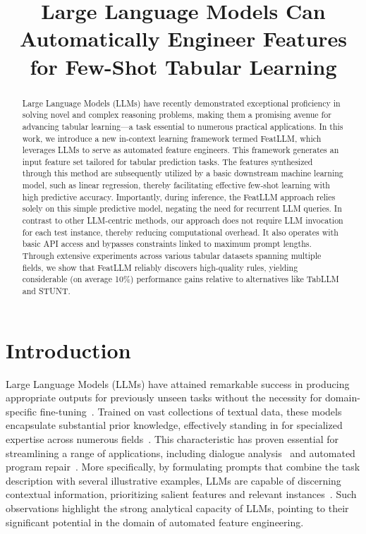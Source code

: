 \title{Large Language Models Can Automatically Engineer Features for Few-Shot Tabular Learning}

\begin{abstract}
Large Language Models (LLMs) have recently demonstrated exceptional proficiency in solving novel and complex reasoning problems, making them a promising avenue for advancing tabular learning—a task essential to numerous practical applications. In this work, we introduce a new in-context learning framework termed \textsf{FeatLLM}, which leverages LLMs to serve as automated feature engineers. This framework generates an input feature set tailored for tabular prediction tasks. The features synthesized through this method are subsequently utilized by a basic downstream machine learning model, such as linear regression, thereby facilitating effective few-shot learning with high predictive accuracy. Importantly, during inference, the \textsf{FeatLLM} approach relies solely on this simple predictive model, negating the need for recurrent LLM queries. In contrast to other LLM-centric methods, our approach does not require LLM invocation for each test instance, thereby reducing computational overhead. It also operates with basic API access and bypasses constraints linked to maximum prompt lengths. Through extensive experiments across various tabular datasets spanning multiple fields, we show that \textsf{FeatLLM} reliably discovers high-quality rules, yielding considerable (on average 10\%) performance gains relative to alternatives like TabLLM and STUNT.
\end{abstract}

\section{Introduction}
Large Language Models (LLMs) have attained remarkable success in producing appropriate outputs for previously unseen tasks without the necessity for domain-specific fine-tuning~\cite{creswell2022selection,imani2023mathprompter,taylor2022galactica}. Trained on vast collections of textual data, these models encapsulate substantial prior knowledge, effectively standing in for specialized expertise across numerous fields~\cite{Genomes2021,singhal2023large,wilcox2003role}. This characteristic has proven essential for streamlining a range of applications, including dialogue analysis~\cite{finch2023leveraging} and automated program repair~\cite{fan2023automated}. More specifically, by formulating prompts that combine the task description with several illustrative examples, LLMs are capable of discerning contextual information, prioritizing salient features and relevant instances~\cite{brown2020language,zhao2023survey}. Such observations highlight the strong analytical capacity of LLMs, pointing to their significant potential in the domain of automated feature engineering.

